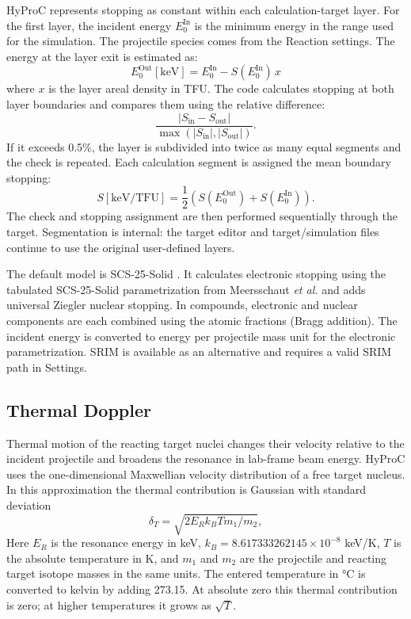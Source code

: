 \documentclass[11pt,a4paper]{article}
\begin{document}
HyProC represents stopping as constant within each calculation-target layer. For the first layer, the incident energy $E_0^\text{In}$ is the minimum energy in the range used for the simulation. The projectile species comes from the Reaction settings. The energy at the layer exit is estimated as:
\begin{equation}
    E_0^\text{Out}[\text{keV}] = E_0^\text{In} - S(E_0^\text{In})\, x
\end{equation}
where $x$ is the layer areal density in TFU. The code calculates stopping at both layer boundaries and compares them using the relative difference:
\begin{equation}
    \frac{|S_\mathrm{in}-S_\mathrm{out}|}
    {\max(|S_\mathrm{in}|,|S_\mathrm{out}|)}.
    \label{eq:stoppingVariation}
\end{equation}
If it exceeds 0.5\%, the layer is subdivided into twice as many equal segments and the check is repeated. Each calculation segment is assigned the mean boundary stopping:
\begin{equation}
    S[\text{keV/TFU}] = \frac{1}{2}
    \left(S(E_0^\text{Out}) + S(E_0^\text{In})\right).
    \label{eq:S_mid}
\end{equation}
The check and stopping assignment are then performed sequentially through the target. Segmentation is internal: the target editor and target/simulation files continue to use the original user-defined layers.

The default model is SCS-25-Solid \cite{meersschaut2026flexible}. It calculates electronic stopping using the tabulated SCS-25-Solid parametrization from Meersschaut \textit{et al.} and adds universal Ziegler nuclear stopping. In compounds, electronic and nuclear components are each combined using the atomic fractions (Bragg addition). The incident energy is converted to energy per projectile mass unit for the electronic parametrization. SRIM \cite{ziegler2010srim} is available as an alternative and requires a valid SRIM path in Settings.

\subsection{Thermal Doppler}
Thermal motion of the reacting target nuclei changes their velocity relative to the incident projectile and broadens the resonance in lab-frame beam energy. HyProC uses the one-dimensional Maxwellian velocity distribution of a free target nucleus. In this approximation the thermal contribution is Gaussian with standard deviation \cite{wang2010handbook}
\begin{equation}
    \delta_T = \sqrt{2 E_R k_B T m_1/m_2},
\end{equation}
Here $E_R$ is the resonance energy in keV, $k_B=8.617333262145\times10^{-8}$ keV/K, $T$ is the absolute temperature in K, and $m_1$ and $m_2$ are the projectile and reacting target isotope masses in the same units. The entered temperature in °C is converted to kelvin by adding 273.15. At absolute zero this thermal contribution is zero; at higher temperatures it grows as $\sqrt{T}$.
\end{document}
